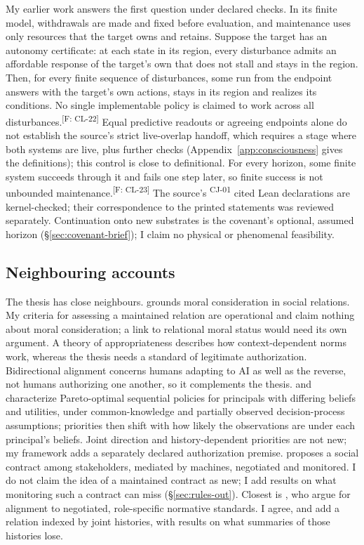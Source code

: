 \documentclass[pdflatex,sn-basic]{sn-jnl}%
\newcommand{\slot}[1]{}%
\newcommand{\claim}[2]{\ifannotated\textsuperscript{\textcolor{blue!60!black}{\tiny[#1: #2]}}\fi}
\newcommand{\rec}[1]{\ifannotated\textsuperscript{\textcolor{blue!60!black}{\tiny#1}}\fi}
\newcommand{\Selfcite}[1]{\ifanonymous\citet{#1}\else My earlier work \citep{#1}\fi}
\begin{document}
\Selfcite{tsiokos2026copy} answers the first question under declared checks. In its finite model, withdrawals are made and fixed before evaluation, and maintenance uses only resources that the target owns and retains. Suppose the target has an autonomy certificate: at each state in its region, every disturbance admits an affordable response of the target's own that does not stall and stays in the region. Then, for every finite sequence of disturbances, some run from the endpoint answers with the target's own actions, stays in its region and realizes its conditions. No single implementable policy is claimed to work across all disturbances.\claim{F}{CL-22} Equal predictive readouts or agreeing endpoints alone do not establish the source's strict live-overlap handoff, which requires a stage where both systems are live, plus further checks (Appendix~\ref{app:consciousness} gives the definitions); this control is close to definitional. For every horizon, some finite system succeeds through it and fails one step later, so finite success is not unbounded maintenance.\claim{F}{CL-23} The source's \numTTPCitedDecls\rec{CJ-01} cited Lean declarations are kernel-checked; their correspondence to the printed statements was reviewed separately. Continuation onto new substrates is the covenant's optional, assumed horizon (\S\ref{sec:covenant-brief}); I claim no physical or phenomenal feasibility.

\subsection{Neighbouring accounts}\label{sec:maintained-neighbours}

\slot{4.5}
The thesis has close neighbours. \citet{coeckelbergh2010} grounds moral consideration in social relations. My criteria for assessing a maintained relation are operational and claim nothing about moral consideration; a link to relational moral status would need its own argument. A theory of appropriateness \citep{leibo2024} describes how context-dependent norms work, whereas the thesis needs a standard of legitimate authorization. Bidirectional alignment \citep{shen2025} concerns humans adapting to AI as well as the reverse, not humans authorizing one another, so it complements the thesis. \citet{critch2017} and \citet{desai2018} characterize Pareto-optimal sequential policies for principals with differing beliefs and utilities, under common-knowledge and partially observed decision-process assumptions; priorities then shift with how likely the observations are under each principal's beliefs. Joint direction and history-dependent priorities are not new; my framework adds a separately declared authorization premise. \citet{rahwan2018} proposes a social contract among stakeholders, mediated by machines, negotiated and monitored. I do not claim the idea of a maintained contract as new; I add results on what monitoring such a contract can miss (\S\ref{sec:rules-out}). Closest is \citet{zhixuan2025}, who argue for alignment to negotiated, role-specific normative standards. I agree, and add a relation indexed by joint histories, with results on what summaries of those histories lose.
\end{document}
